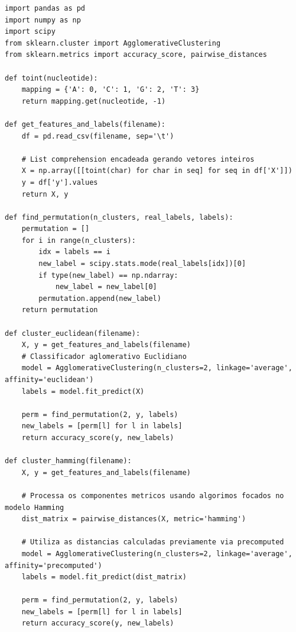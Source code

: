 \documentclass[11pt,a4paper]{article}
\begin{document}
\begin{solucao}
\begin{lstlisting}
import pandas as pd
import numpy as np
import scipy
from sklearn.cluster import AgglomerativeClustering
from sklearn.metrics import accuracy_score, pairwise_distances

def toint(nucleotide):
    mapping = {'A': 0, 'C': 1, 'G': 2, 'T': 3}
    return mapping.get(nucleotide, -1)

def get_features_and_labels(filename):
    df = pd.read_csv(filename, sep='\t')
    
    # List comprehension encadeada gerando vetores inteiros
    X = np.array([[toint(char) for char in seq] for seq in df['X']])
    y = df['y'].values
    return X, y

def find_permutation(n_clusters, real_labels, labels):
    permutation = []
    for i in range(n_clusters):
        idx = labels == i
        new_label = scipy.stats.mode(real_labels[idx])[0]
        if type(new_label) == np.ndarray:
            new_label = new_label[0]
        permutation.append(new_label)
    return permutation

def cluster_euclidean(filename):
    X, y = get_features_and_labels(filename)
    # Classificador aglomerativo Euclidiano
    model = AgglomerativeClustering(n_clusters=2, linkage='average', affinity='euclidean')
    labels = model.fit_predict(X)
    
    perm = find_permutation(2, y, labels)
    new_labels = [perm[l] for l in labels]
    return accuracy_score(y, new_labels)

def cluster_hamming(filename):
    X, y = get_features_and_labels(filename)
    
    # Processa os componentes metricos usando algorimos focados no modelo Hamming
    dist_matrix = pairwise_distances(X, metric='hamming')
    
    # Utiliza as distancias calculadas previamente via precomputed
    model = AgglomerativeClustering(n_clusters=2, linkage='average', affinity='precomputed')
    labels = model.fit_predict(dist_matrix)
    
    perm = find_permutation(2, y, labels)
    new_labels = [perm[l] for l in labels]
    return accuracy_score(y, new_labels)
\end{lstlisting}
\end{solucao}
\end{document}
